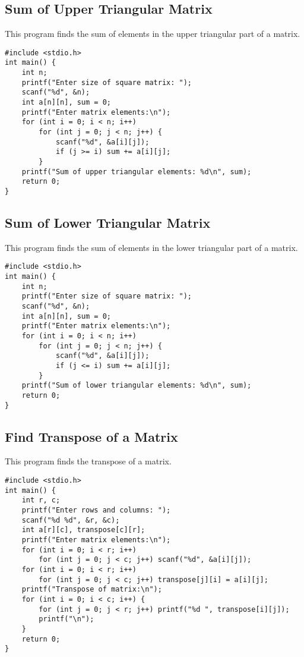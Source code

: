 \documentclass[a4paper,12pt]{article}
\begin{document}
\subsection{Sum of Upper Triangular Matrix}
This program finds the sum of elements in the upper triangular part of a matrix.
\begin{lstlisting}[caption={Sum of Upper Triangular Matrix}]
#include <stdio.h>
int main() {
    int n;
    printf("Enter size of square matrix: ");
    scanf("%d", &n);
    int a[n][n], sum = 0;
    printf("Enter matrix elements:\n");
    for (int i = 0; i < n; i++)
        for (int j = 0; j < n; j++) {
            scanf("%d", &a[i][j]);
            if (j >= i) sum += a[i][j];
        }
    printf("Sum of upper triangular elements: %d\n", sum);
    return 0;
}
\end{lstlisting}
\clearpage

\subsection{Sum of Lower Triangular Matrix}
This program finds the sum of elements in the lower triangular part of a matrix.
\begin{lstlisting}[caption={Sum of Lower Triangular Matrix}]
#include <stdio.h>
int main() {
    int n;
    printf("Enter size of square matrix: ");
    scanf("%d", &n);
    int a[n][n], sum = 0;
    printf("Enter matrix elements:\n");
    for (int i = 0; i < n; i++)
        for (int j = 0; j < n; j++) {
            scanf("%d", &a[i][j]);
            if (j <= i) sum += a[i][j];
        }
    printf("Sum of lower triangular elements: %d\n", sum);
    return 0;
}
\end{lstlisting}
\clearpage

\subsection{Find Transpose of a Matrix}
This program finds the transpose of a matrix.
\begin{lstlisting}[caption={Find Transpose of a Matrix}]
#include <stdio.h>
int main() {
    int r, c;
    printf("Enter rows and columns: ");
    scanf("%d %d", &r, &c);
    int a[r][c], transpose[c][r];
    printf("Enter matrix elements:\n");
    for (int i = 0; i < r; i++)
        for (int j = 0; j < c; j++) scanf("%d", &a[i][j]);
    for (int i = 0; i < r; i++)
        for (int j = 0; j < c; j++) transpose[j][i] = a[i][j];
    printf("Transpose of matrix:\n");
    for (int i = 0; i < c; i++) {
        for (int j = 0; j < r; j++) printf("%d ", transpose[i][j]);
        printf("\n");
    }
    return 0;
}
\end{lstlisting}
\clearpage
\end{document}
